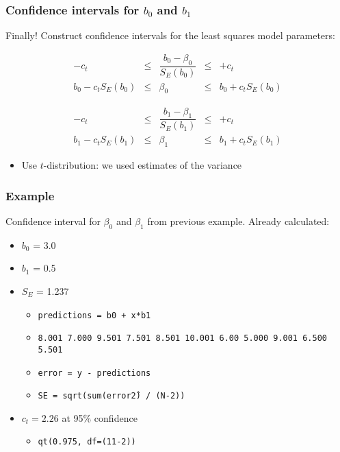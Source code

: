 \begin{frame}\frametitle{Confidence intervals for $b_0$ and $b_1$}

	Finally! Construct confidence intervals for the least squares model parameters:

	$$
	\begin{array}{rcccl}
		- c_t &\leq& \dfrac{b_0 - \beta_0}{S_E(b_0)} &\leq & +c_t \\
		b_0 - c_t S_E(b_0) &\leq& \beta_0 &\leq& b_0 + c_t S_E(b_0)
	\end{array}
	$$

	\vspace{24pt}

	$$
	\begin{array}{rcccl}
		- c_t &\leq& \dfrac{b_1 - \beta_1}{S_E(b_1)} &\leq & +c_t\\
		b_1 - c_t S_E(b_1) &\leq& \beta_1 &\leq& b_1 + c_t S_E(b_1)
	\end{array}
	$$
	\begin{itemize}
		\item	Use $t$-distribution: we used estimates of the variance
	\end{itemize}
\end{frame}

\begin{frame}\frametitle{Example}

	Confidence interval for $\beta_0$ and $\beta_1$ from previous example. Already calculated:
	\begin{itemize}
		\item	$b_0$ = 3.0
		\item	$b_1$ = 0.5
		\item	$S_E$ = 1.237
		\begin{itemize}
			\item	\texttt{predictions = b0 + x*b1}
			\item	\texttt{8.001 7.000 9.501 7.501 8.501 10.001 6.00 5.000 9.001 6.500 5.501}
			\item	\texttt{error = y - predictions}
			\item	\texttt{SE = sqrt(sum(error\^ 2) / (N-2))}
		\end{itemize}
		\item	$c_t = 2.26$ at 95\% confidence
		\begin{itemize}
			\item	\texttt{qt(0.975, df=(11-2))}
		\end{itemize}
	\end{itemize}
\end{frame}

